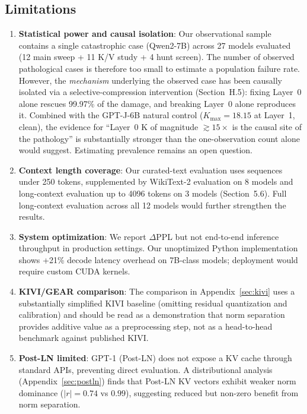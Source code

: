 \documentclass[11pt]{article}
\begin{document}
\subsection{Limitations}

\begin{enumerate}[nosep]
  \item \textbf{Statistical power and causal isolation}: Our observational sample contains a single catastrophic case (Qwen2-7B) across 27 models evaluated (12 main sweep + 11 K/V study + 4 hunt screen). The number of observed pathological cases is therefore too small to estimate a population failure rate. However, the \emph{mechanism} underlying the observed case has been causally isolated via a selective-compression intervention (Section~H.5): fixing Layer~0 alone rescues 99.97\% of the damage, and breaking Layer~0 alone reproduces it. Combined with the GPT-J-6B natural control ($K_{\max}=18.15$ at Layer~1, clean), the evidence for ``Layer~0 K of magnitude $\gtrsim 15\times$ is the causal site of the pathology'' is substantially stronger than the one-observation count alone would suggest. Estimating prevalence remains an open question.
  \item \textbf{Context length coverage}: Our curated-text evaluation uses sequences under 250 tokens, supplemented by WikiText-2 evaluation on 8 models and long-context evaluation up to 4096 tokens on 3 models (Section~5.6). Full long-context evaluation across all 12 models would further strengthen the results.
  \item \textbf{System optimization}: We report $\Delta$PPL but not end-to-end inference throughput in production settings. Our unoptimized Python implementation shows +21\% decode latency overhead on 7B-class models; deployment would require custom CUDA kernels.
  \item \textbf{KIVI/GEAR comparison}: The comparison in Appendix~\ref{sec:kivi} uses a substantially simplified KIVI baseline (omitting residual quantization and calibration) and should be read as a demonstration that norm separation provides additive value as a preprocessing step, not as a head-to-head benchmark against published KIVI.
  \item \textbf{Post-LN limited}: GPT-1 (Post-LN) does not expose a KV cache through standard APIs, preventing direct evaluation. A distributional analysis (Appendix~\ref{sec:postln}) finds that Post-LN KV vectors exhibit weaker norm dominance ($|r|=0.74$ vs $0.99$), suggesting reduced but non-zero benefit from norm separation.
\end{enumerate}
\end{document}
